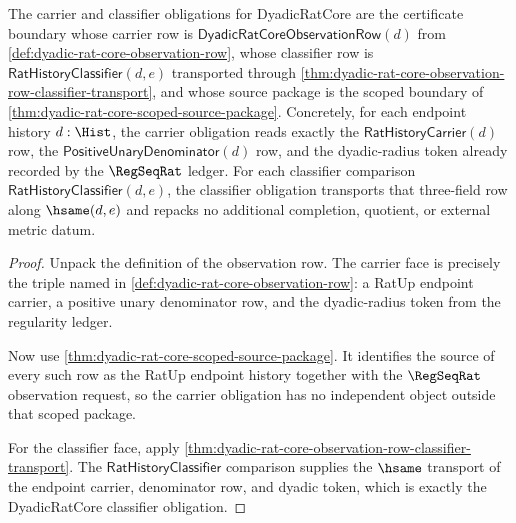 \begin{theorem}
\label{thm:dyadic-rat-core-carrier-classifier-obligations}
The carrier and classifier obligations for DyadicRatCore are the certificate
boundary whose carrier row is
$\mathsf{DyadicRatCoreObservationRow}(d)$ from
\autoref{def:dyadic-rat-core-observation-row}, whose classifier row is
$\mathsf{RatHistoryClassifier}(d,e)$ transported through
\autoref{thm:dyadic-rat-core-observation-row-classifier-transport}, and whose
source package is the scoped boundary of
\autoref{thm:dyadic-rat-core-scoped-source-package}. Concretely, for each
endpoint history $d:\Hist$, the carrier obligation reads exactly the
$\mathsf{RatHistoryCarrier}(d)$ row, the
$\mathsf{PositiveUnaryDenominator}(d)$ row, and the dyadic-radius token already
recorded by the $\RegSeqRat$ ledger. For each classifier comparison
$\mathsf{RatHistoryClassifier}(d,e)$, the classifier obligation transports
that three-field row along $\hsame(d,e)$ and repacks no additional completion,
quotient, or external metric datum.
\end{theorem}
\begin{proof}
Unpack the definition of the observation row. The carrier face is precisely the
triple named in \autoref{def:dyadic-rat-core-observation-row}: a RatUp endpoint
carrier, a positive unary denominator row, and the dyadic-radius token from the
regularity ledger.

Now use \autoref{thm:dyadic-rat-core-scoped-source-package}. It identifies the
source of every such row as the RatUp endpoint history together with the
$\RegSeqRat$ observation request, so the carrier obligation has no independent
object outside that scoped package.

For the classifier face, apply
\autoref{thm:dyadic-rat-core-observation-row-classifier-transport}. The
$\mathsf{RatHistoryClassifier}$ comparison supplies the $\hsame$ transport of
the endpoint carrier, denominator row, and dyadic token, which is exactly the
DyadicRatCore classifier obligation.
\end{proof}


